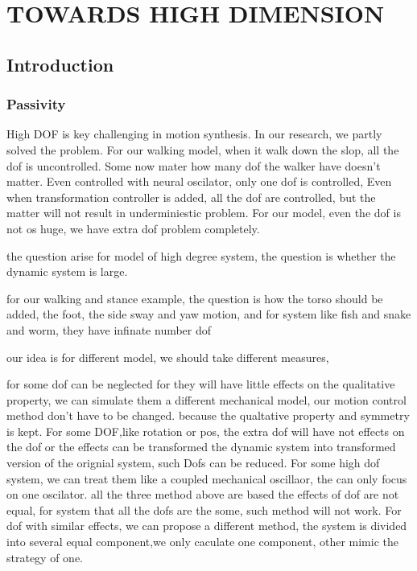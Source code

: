 \chapter{TOWARDS HIGH DIMENSION}
\label{chap:highdor}
\section{Introduction}
\subsection*{Passivity}
High DOF is key challenging in motion synthesis.
In our research, we partly solved the problem.
For our walking model, when it walk down the slop, all the dof is uncontrolled.
Some now mater how many dof the walker have doesn't matter.
Even controlled with neural oscilator, only one dof is controlled, 
Even when transformation controller is added, all the dof are controlled, but the matter will not result in underminiestic problem.
For our model, even the dof is not os huge, we have extra dof problem completely.

the question arise for model of high degree system, the question is whether the dynamic system is large.


for our walking and stance example, the question is how the torso should be added, the foot, the side sway and yaw motion, and for system like fish and snake and worm,
they have infinate number dof 

our idea is for different model, 
we should take different measures, 
\begin{itemize}

for some dof can be neglected for they will have little effects on the qualitative property, 
we can simulate them a different mechanical model, our motion control method don't have to be changed.
because the qualtative property and symmetry is kept.
For some DOF,like rotation or pos, the extra dof will have not effects on the dof or the effects can be transformed the dynamic system into transformed version of the orignial system,
such Dofs can be reduced.
For some high dof system, we can treat them like a coupled mechanical oscillaor, the can only focus on one oscilator.
all the three method above are based the effects of dof are not equal, for system that all the dofs are the some, such method will not work.
For dof with similar effects, we can propose a different method, the system is divided into several equal component,we only caculate one component, other mimic the strategy of one.

\end{itemize} 

